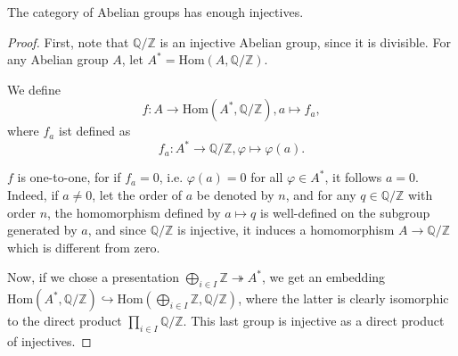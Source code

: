 \documentclass[12pt]{article}
\begin{document}
The category of Abelian groups has enough injectives.

\begin{proof}
First, note that $\mathbb{Q}/\mathbb{Z}$ is an injective Abelian group, since it is divisible.
For any Abelian group $A$, let $A^* = \mathrm{Hom}(A, \mathbb{Q}/\mathbb{Z})$.

We define
\[ f: A \to \mathrm{Hom}(A^*, \mathbb{Q}/\mathbb{Z}), a \mapsto f_a, \]
where $f_a$ ist defined as
\[ f_a : A^* \to \mathbb{Q}/\mathbb{Z}, \varphi \mapsto \varphi(a). \]

$f$ is one-to-one, for if $f_a = 0$, i.e. $\varphi(a) = 0$ for all $\varphi \in A^*$, it follows $a = 0$. Indeed, if $a \neq 0$, let the order of $a$ be denoted by $n$, and for any $q \in \mathbb{Q}/\mathbb{Z}$ with order $n$, the homomorphism defined by $a \mapsto q$ is well-defined on the subgroup generated by $a$, and since $\mathbb{Q}/\mathbb{Z}$ is injective, it induces a homomorphism $A \to \mathbb{Q}/\mathbb{Z}$ which is different from zero.

Now, if we chose a presentation $\bigoplus_{i \in I} \mathbb{Z} \twoheadrightarrow A^*$, we get an embedding $\mathrm{Hom}(A^*, \mathbb{Q}/\mathbb{Z}) \hookrightarrow \mathrm{Hom}(\bigoplus_{i \in I} \mathbb{Z}, \mathbb{Q}/\mathbb{Z})$, where the latter is clearly isomorphic to the direct product $\prod_{i \in I} \mathbb{Q}/\mathbb{Z}$. This last group is injective as a direct product of injectives.
\end{proof}
\end{document}
